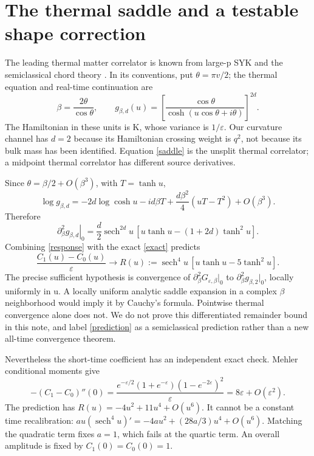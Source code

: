 \documentclass[11pt]{article}
\newcommand{\sech}{\operatorname{sech}}
\begin{document}
\newpage
\section{The thermal saddle and a testable shape correction}
The leading thermal matter correlator is known from large-p SYK
and the semiclassical chord theory \cite{ls}. In its conventions,
put $\theta=\pi v/2$; the thermal equation and real-time continuation are
\begin{equation}\label{saddle}
 \beta=\frac{2\theta}{\cos\theta},\qquad
 g_{\beta,d}(u)=
 \left[\frac{\cos\theta}{\cosh(u\cos\theta+i\theta)}\right]^{2d}.
\end{equation}
The Hamiltonian in these units is K, whose variance is
$1/\varepsilon$. Our curvature channel has $d=2$ because its
Hamiltonian crossing weight is $q^2$, not because its bulk mass
has been identified. Equation \eqref{saddle} is the unsplit
thermal correlator; a midpoint thermal correlator has different
source derivatives.

Since $\theta=\beta/2+O(\beta^3)$, with $T=\tanh u$,
\[
 \log g_{\beta,d}
 =-2d\log\cosh u-id\beta T
       +\frac{d\beta^2}{4}(uT-T^2)+O(\beta^3).
\]
Therefore
\begin{equation}\label{response}
 \left.\partial_\beta^2g_{\beta,d}\right|_0
 =\frac d2\sech^{2d}u\,[u\tanh u-(1+2d)\tanh^2u].
\end{equation}
Combining \eqref{response} with the exact \eqref{exact} predicts
\begin{equation}\label{prediction}
 \frac{C_1(u)-C_0(u)}{\varepsilon}\longrightarrow
 R(u):=\sech^4u\,[u\tanh u-5\tanh^2u].
\end{equation}
The precise sufficient hypothesis is convergence of
$\partial_\beta^2G_{\varepsilon,\beta}|_0$ to
$\partial_\beta^2g_{\beta,2}|_0$, locally uniformly in u.
A locally uniform analytic saddle expansion in a complex
$\beta$ neighborhood would imply it by Cauchy's formula.
Pointwise thermal convergence alone does not. We do not prove
this differentiated remainder bound in this note, and label
\eqref{prediction} as a semiclassical prediction rather than a
new all-time convergence theorem.

Nevertheless the short-time coefficient has an independent exact
check. Mehler conditional moments give
\begin{equation}\label{curvature}
 -(C_1-C_0)''(0)=
 \frac{e^{-\varepsilon/2}(1+e^{-\varepsilon})
                   (1-e^{-2\varepsilon})^2}{\varepsilon}
 =8\varepsilon+O(\varepsilon^2).
\end{equation}
The prediction has $R(u)=-4u^2+11u^4+O(u^6)$.
It cannot be a constant time recalibration:
$a u(\sech^4u)'=-4a u^2+(28a/3)u^4+O(u^6)$.
Matching the quadratic term fixes $a=1$, which fails at the
quartic term. An overall amplitude is fixed by $C_1(0)=C_0(0)=1$.
\end{document}
